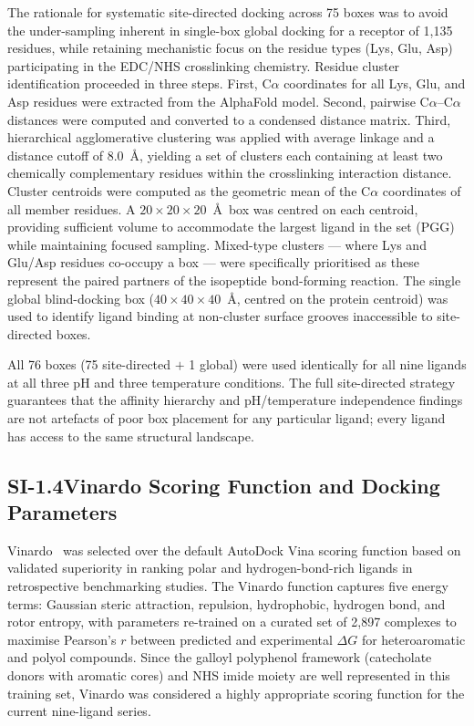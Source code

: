 \documentclass[11pt]{article}
\begin{document}
The rationale for systematic site-directed docking across 75 boxes was to
avoid the under-sampling inherent in single-box global docking for a receptor
of 1,135 residues, while retaining mechanistic focus on the residue types
(Lys, Glu, Asp) participating in the EDC/NHS crosslinking chemistry.
Residue cluster identification proceeded in three steps.
First, C$\alpha$ coordinates for all Lys, Glu, and Asp residues were extracted
from the AlphaFold model.
Second, pairwise C$\alpha$--C$\alpha$ distances were computed and converted to
a condensed distance matrix.
Third, hierarchical agglomerative clustering was applied with average linkage
and a distance cutoff of 8.0~\AA, yielding a set of clusters each containing
at least two chemically complementary residues within the crosslinking
interaction distance.
Cluster centroids were computed as the geometric mean of the C$\alpha$
coordinates of all member residues.
A $20 \times 20 \times 20$~\AA\ box was centred on each centroid,
providing sufficient volume to accommodate the largest ligand in the set (PGG)
while maintaining focused sampling.
Mixed-type clusters --- where Lys and Glu/Asp residues co-occupy a box ---
were specifically prioritised as these represent the paired partners of the
isopeptide bond-forming reaction.
The single global blind-docking box ($40 \times 40 \times 40$~\AA, centred on
the protein centroid) was used to identify ligand binding at non-cluster surface
grooves inaccessible to site-directed boxes.

All 76 boxes (75 site-directed $+$ 1 global) were used identically for all
nine ligands at all three pH and three temperature conditions.
The full site-directed strategy guarantees that the affinity hierarchy and
pH/temperature independence findings are not artefacts of poor box placement
for any particular ligand; every ligand has access to the same structural
landscape.

\subsection*{SI-1.4\quad Vinardo Scoring Function and Docking Parameters}

Vinardo~\cite{quiroga2016vinardo} was selected over the default AutoDock Vina
scoring function based on validated superiority in ranking polar and
hydrogen-bond-rich ligands in retrospective benchmarking studies.
The Vinardo function captures five energy terms: Gaussian steric attraction,
repulsion, hydrophobic, hydrogen bond, and rotor entropy, with parameters
re-trained on a curated set of 2,897 complexes to maximise Pearson's $r$
between predicted and experimental $\Delta G$ for heteroaromatic and
polyol compounds.
Since the galloyl polyphenol framework (catecholate donors with
aromatic cores) and NHS imide moiety are well represented in this training
set, Vinardo was considered a highly appropriate scoring function for the
current nine-ligand series.
\end{document}
